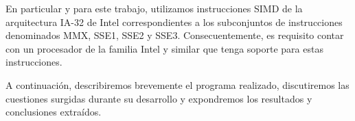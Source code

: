 En particular y para este trabajo, utilizamos instrucciones SIMD de la arquitectura IA-32 de Intel correspondientes a los subconjuntos de instrucciones denominados MMX, SSE1, SSE2 y SSE3. Consecuentemente, es requisito contar con un procesador de la familia Intel y similar que tenga soporte para estas instrucciones. 

A continuación, describiremos brevemente el programa realizado, discutiremos las cuestiones surgidas durante su desarrollo y expondremos los resultados y conclusiones extraídos.






